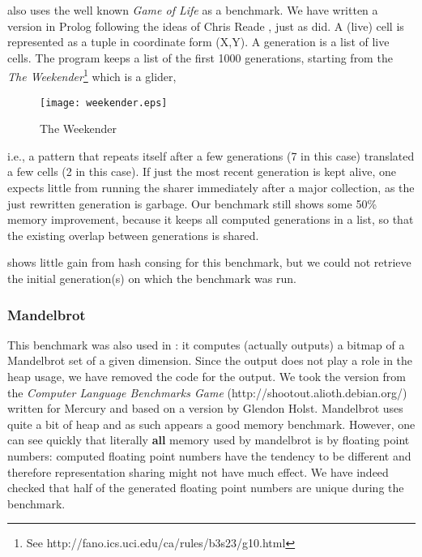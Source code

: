 \documentclass{tlp}
\begin{document}
\cite{appelhashconsinggc} also uses the well known {\em Game of Life}
as a benchmark. We have written a version in Prolog following the
ideas of Chris Reade \cite{ChrisReade}, just as
\cite{appelhashconsinggc} did. A (live) cell is represented as a tuple
in coordinate form (X,Y). A generation is a list of live cells. The
program keeps a list of the first 1000 generations, starting from 
the {\em The Weekender}\footnote{See
http://fano.ics.uci.edu/ca/rules/b3s23/g10.html} which is a glider,
\begin{wrapfigure}{r}{.35\textwidth}
\begin{center}\texttt{[image: weekender.eps]}\end{center}
\caption{The Weekender}
\end{wrapfigure}
i.e., a pattern that repeats itself after a few generations (7 in this
case) translated a few cells (2 in this case). If just the most recent
generation is kept alive, one expects little from running the sharer
immediately after a major collection, as the just rewritten generation
is garbage. Our benchmark still shows some 50\% memory improvement,
because it keeps all computed generations in a list, so that the
existing overlap between generations is shared.


\cite{appelhashconsinggc} shows little gain from hash consing for this
benchmark, but we could not retrieve the initial generation(s) on
which the benchmark was run.



\subsubsection{Mandelbrot}

This benchmark was also used in \cite{appelhashconsinggc}: it computes
(actually outputs) a bitmap of a Mandelbrot set of a given
dimension. Since the output does not play a role in the heap usage, we
have removed the code for the output. We took the version from the
{\em Computer Language Benchmarks Game}
(http://shootout.alioth.debian.org/) written for Mercury and based on
a version by Glendon Holst. Mandelbrot uses quite a bit of heap and as
such appears a good memory benchmark. However, one can see quickly
that literally {\bf all} memory used by mandelbrot is by floating
point numbers: computed floating point numbers have the tendency to be
different and therefore representation sharing might not have much
effect. We have indeed checked that half of the generated floating
point numbers are unique during the benchmark.
\end{document}
